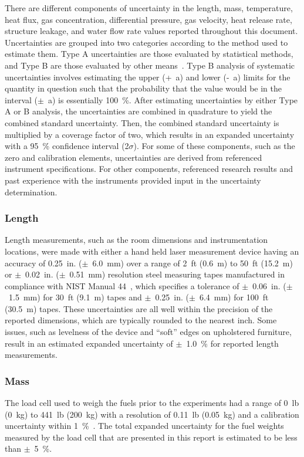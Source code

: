 \documentclass[12pt,oneside]{book}
\begin{document}
There are different components of uncertainty in the length, mass, temperature, heat flux, gas concentration, differential pressure, gas velocity, heat release rate, structure leakage, and water flow rate values reported throughout this document. Uncertainties are grouped into two categories according to the method used to estimate them. Type A uncertainties are those evaluated by statistical methods, and Type B are those evaluated by other means~\cite{Taylor&Kuyatt:1994}. Type B analysis of systematic uncertainties involves estimating the upper (+~a) and lower (-~a) limits for the quantity in question such that the probability that the value would be in the interval ($\pm$~a) is essentially 100~\%. After estimating uncertainties by either Type A or B analysis, the uncertainties are combined in quadrature to yield the combined standard uncertainty. Then, the combined standard uncertainty is multiplied by a coverage factor of two, which results in an expanded uncertainty with a 95~\% confidence interval (2$\sigma$). For some of these components, such as the zero and calibration elements, uncertainties are derived from referenced instrument specifications. For other components, referenced research results and past experience with the instruments provided input in the uncertainty determination.

\subsubsection*{Length}
Length measurements, such as the room dimensions and instrumentation locations, were made with either a hand held laser measurement device having an accuracy of 0.25~in. ($\pm$~6.0~mm) over a range of 2~ft (0.6~m) to 50~ft (15.2~m)~\cite{StanleyTools} or $\pm$~0.02~in. ($\pm$~0.51~mm) resolution steel measuring tapes manufactured in compliance with NIST Manual 44~\cite{Butcher:2012}, which specifies a tolerance of $\pm$~0.06~in. ($\pm$~1.5~mm) for 30~ft (9.1~m) tapes and $\pm$~0.25~in. ($\pm$~6.4~mm) for 100~ft (30.5~m) tapes. These uncertainties are all well within the precision of the reported dimensions, which are typically rounded to the nearest inch. Some issues, such as levelness of the device and ``soft'' edges on upholstered furniture, result in an estimated expanded uncertainty of $\pm$~1.0~\% for reported length measurements.

\subsubsection*{Mass}
The load cell used to weigh the fuels prior to the experiments had a range of 0~lb (0~kg) to 441~lb (200~kg) with a resolution of 0.11~lb (0.05~kg) and a calibration uncertainty within 1~\%~\cite{Ohaus:2000}. The total expanded uncertainty for the fuel weights measured by the load cell that are presented in this report is estimated to be less than $\pm$~5~\%.
\end{document}
